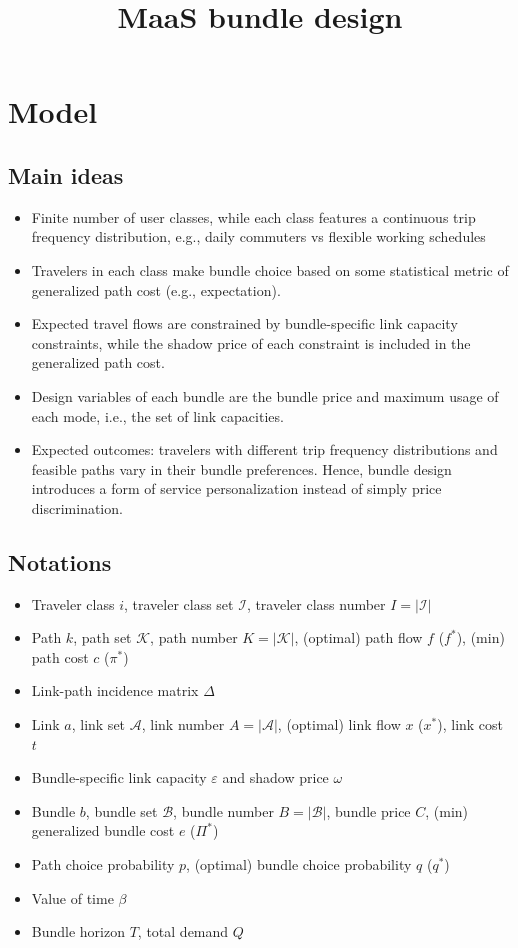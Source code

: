 \documentclass{article}
\title{MaaS bundle design}
\newcommand{\setK}{\mathcal{K}}
\newcommand{\setA}{\mathcal{A}}
\newcommand{\setB}{\mathcal{B}}
\newcommand{\setI}{\mathcal{I}}
\begin{document}
\maketitle

\section{Model}

\subsection{Main ideas}
\begin{itemize}
    \item Finite number of user classes, while each class features a continuous trip frequency distribution, e.g., daily commuters vs flexible working schedules
    \item Travelers in each class make bundle choice based on some statistical metric of generalized path cost (e.g., expectation). 
    \item Expected travel flows are constrained by bundle-specific link capacity constraints, while the shadow price of each constraint is included in the generalized path cost. 
    \item Design variables of each bundle are the bundle price and maximum usage of each mode, i.e., the set of link capacities. 
    \item Expected outcomes: travelers with different trip frequency distributions and feasible paths vary in their bundle preferences. Hence, bundle design introduces a form of service personalization instead of simply price discrimination.
\end{itemize}

\subsection{Notations}
\begin{itemize}
    \item Traveler class $i$, traveler class set $\setI$, traveler class number $I = |\setI|$
    \item Path $k$, path set $\setK$, path number $K = |\setK|$, (optimal) path flow $f$ ($f^*$), (min) path cost $c$ ($\pi^*$)
    \item Link-path incidence matrix $\Delta$
    \item Link $a$, link set $\setA$, link number $A=|\setA|$, (optimal) link flow $x$ ($x^*$), link cost $t$
    \item Bundle-specific link capacity $\varepsilon$ and shadow price $\omega$
    \item Bundle $b$, bundle set $\setB$, bundle number $B=|\setB|$, bundle price $C$, (min) generalized bundle cost $e$ ($\Pi^*$)
    \item Path choice probability $p$, (optimal) bundle choice probability $q$ ($q^*$)
    \item Value of time $\beta$
    \item Bundle horizon $T$, total demand $Q$
\end{itemize}
\end{document}
